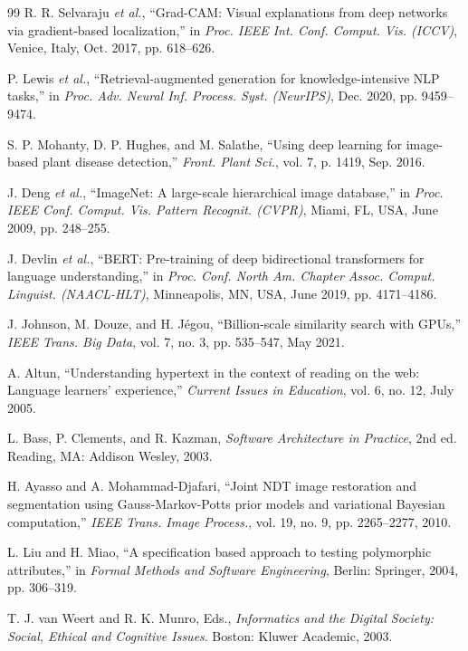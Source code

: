 \documentclass[12pt, a4paper]{report}
\begin{document}
\begin{thebibliography}{99}
R. R. Selvaraju \textit{et al.}, ``Grad-CAM: Visual explanations from deep networks via gradient-based localization,'' in \textit{Proc. IEEE Int. Conf. Comput. Vis. (ICCV)}, Venice, Italy, Oct. 2017, pp. 618--626.

P. Lewis \textit{et al.}, ``Retrieval-augmented generation for knowledge-intensive NLP tasks,'' in \textit{Proc. Adv. Neural Inf. Process. Syst. (NeurIPS)}, Dec. 2020, pp. 9459--9474.

S. P. Mohanty, D. P. Hughes, and M. Salathe, ``Using deep learning for image-based plant disease detection,'' \textit{Front. Plant Sci.}, vol. 7, p. 1419, Sep. 2016.

J. Deng \textit{et al.}, ``ImageNet: A large-scale hierarchical image database,'' in \textit{Proc. IEEE Conf. Comput. Vis. Pattern Recognit. (CVPR)}, Miami, FL, USA, June 2009, pp. 248--255.

J. Devlin \textit{et al.}, ``BERT: Pre-training of deep bidirectional transformers for language understanding,'' in \textit{Proc. Conf. North Am. Chapter Assoc. Comput. Linguist. (NAACL-HLT)}, Minneapolis, MN, USA, June 2019, pp. 4171--4186.

J. Johnson, M. Douze, and H. Jégou, ``Billion-scale similarity search with GPUs,'' \textit{IEEE Trans. Big Data}, vol. 7, no. 3, pp. 535--547, May 2021.

A. Altun, ``Understanding hypertext in the context of reading on the web: Language learners' experience,'' \textit{Current Issues in Education}, vol. 6, no. 12, July 2005.

L. Bass, P. Clements, and R. Kazman, \textit{Software Architecture in Practice}, 2nd ed. Reading, MA: Addison Wesley, 2003.

H. Ayasso and A. Mohammad-Djafari, ``Joint NDT image restoration and segmentation using Gauss-Markov-Potts prior models and variational Bayesian computation,'' \textit{IEEE Trans. Image Process.}, vol. 19, no. 9, pp. 2265--2277, 2010.

L. Liu and H. Miao, ``A specification based approach to testing polymorphic attributes,'' in \textit{Formal Methods and Software Engineering}, Berlin: Springer, 2004, pp. 306--319.

T. J. van Weert and R. K. Munro, Eds., \textit{Informatics and the Digital Society: Social, Ethical and Cognitive Issues}. Boston: Kluwer Academic, 2003.


\end{thebibliography}
\end{document}
